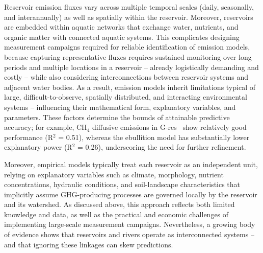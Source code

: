 \documentclass[10pt]{article}
\begin{document}
Reservoir emission fluxes vary across multiple temporal scales (daily, seasonally, and interannually) as well as spatially within the reservoir.
Moreover, reservoirs are embedded within aquatic networks that exchange water, nutrients, and organic matter with connected aquatic systems. 
This complicates designing measurement campaigns required for reliable identification of emission models, because capturing representative fluxes requires sustained monitoring over long periods and multiple locations in a reservoir -- already logistically demanding and costly -- while also considering interconnections between reservoir systems and adjacent water bodies.
As a result, emission models inherit limitations typical of large, difficult-to-observe, spatially distributed, and interacting environmental systems -- influencing their mathematical form, explanatory variables, and parameters.
These factors determine the bounds of attainable predictive accuracy; for example, CH$_4$ diffusive emissions in G-res~\citep{Prairie2021} show relatively good performance (R$^2$ = 0.51), whereas the ebullition model has substantially lower explanatory power (R$^2$ = 0.26), underscoring the need for further refinement.

Moreover, empirical models typically treat each reservoir as an independent unit, relying on explanatory variables such as climate, morphology, nutrient concentrations, hydraulic conditions, and soil-landscape characteristics that implicitly assume \ac{GHG}-producing processes are governed locally by the reservoir and its watershed.
As discussed above, this approach reflects both limited knowledge and data, as well as the practical and economic challenges of implementing large-scale measurement campaigns.
Nevertheless, a growing body of evidence shows that reservoirs and rivers operate as interconnected systems -- and that ignoring these linkages can skew predictions.
\end{document}
